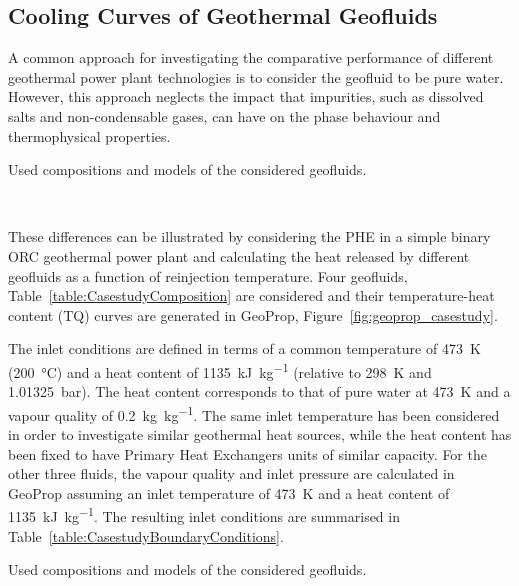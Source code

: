 \subsection{Cooling Curves of Geothermal Geofluids}
\label{sec:tppm_geoprop_casestudies}

    A common approach for investigating the comparative performance of different geothermal power plant technologies is to consider the geofluid to be pure water. However, this approach neglects the impact that impurities, such as dissolved salts and non-condensable gases, can have on the phase behaviour and thermophysical properties.

    \begin{table}[H]
        \caption{Used compositions and models of the considered geofluids.}
        \centering 
        \label{table:CasestudyComposition}
           
        \\[10pt]
    \end{table}

    These differences can be illustrated by considering the \ac{PHE} in a simple binary ORC geothermal power plant and calculating the heat released by different geofluids as a function of reinjection temperature. Four geofluids, Table~\ref{table:CasestudyComposition} are considered and their temperature-heat content (TQ) curves are generated in GeoProp, Figure~\ref{fig:geoprop_casestudy}.
    
    The inlet conditions are defined in terms of a common temperature of \qty{473}{\K} (\qty{200}{\degreeCelsius}) and a heat content of \qty{1135}{\kilo\joule \per \kg} (relative to \qty{298}{\K} and \qty{1.01325}{\bar}). The heat content corresponds to that of pure water at \qty{473}{\K} and a vapour quality of \qty{0.2}{\kg\per\kg}. The same inlet temperature has been considered in order to investigate similar geothermal heat sources, while the heat content has been fixed to have Primary Heat Exchangers units of similar capacity. For the other three fluids, the vapour quality and inlet pressure are calculated in GeoProp assuming an inlet temperature of \qty{473}{\K} and a heat content of \qty{1135}{\kilo\joule \per \kg}. The resulting inlet conditions are summarised in Table~\ref{table:CasestudyBoundaryConditions}.

    \begin{table}[H]
        \caption{Used compositions and models of the considered geofluids.}
        \centering 
        \label{table:CasestudyBoundaryConditions}
                 
        \\[10pt]
    \end{table}

